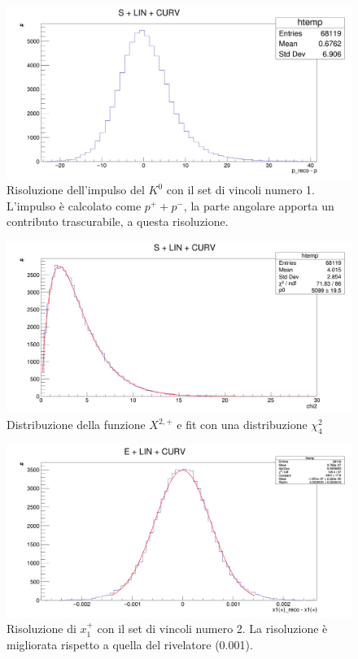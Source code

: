 \documentclass[8pt]{extarticle}
\begin{document}
\begin{figure} [h!]
	\begin{center}
		\includegraphics[scale=0.25]{set_1_p} 
		\caption{Risoluzione dell'impulso del $K^0$ con il set di vincoli numero 1. L'impulso è calcolato come $p^+ + p^-$, la parte angolare apporta un contributo trascurabile, a questa risoluzione.}
		\label{fig:set_1_p}
	\end{center}
\end{figure}

\begin{figure} [h!]
	\begin{center}
		\includegraphics[scale=0.25]{set_1_chi2} 
		\caption{Distribuzione della funzione $X^{2,+}$ e fit con una distribuzione $\chi^2_4$}
		\label{fig:set_1_chi2}
	\end{center}
\end{figure}

\begin{figure} [h!]
	\begin{center}
		\includegraphics[scale=0.25]{set_2_x} 
		\caption{Risoluzione di $x_1^+$ con il set di vincoli numero 2. La risoluzione è migliorata rispetto a quella del rivelatore (0.001).}
		\label{fig:set_2_x}
	\end{center}
\end{figure}
\end{document}
